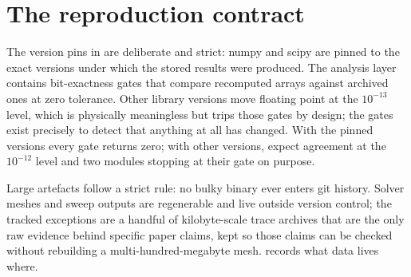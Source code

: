 \section{The reproduction contract}

The version pins in  are deliberate and strict:
numpy and scipy are pinned to the exact versions under which the
stored results were produced. The analysis layer contains
bit-exactness gates that compare recomputed arrays against archived
ones at zero tolerance. Other library versions move floating point at
the $10^{-13}$ level, which is physically meaningless but trips those
gates by design; the gates exist precisely to detect that anything at
all has changed. With the pinned versions every gate returns zero;
with other versions, expect agreement at the $10^{-12}$ level and two
modules stopping at their gate on purpose.

Large artefacts follow a strict rule: no bulky binary ever enters git
history. Solver meshes and sweep outputs are regenerable and live
outside version control; the tracked exceptions are a handful of
kilobyte-scale trace archives that are the only raw evidence behind
specific paper claims, kept so those claims can be checked without
rebuilding a multi-hundred-megabyte mesh.  records what
data lives where.
